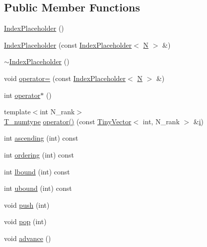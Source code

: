 \subsection*{Public Member Functions}
\begin{DoxyCompactItemize}
\item 
\hyperlink{classIndexPlaceholder_abb86f5feb838be57b819e7605702fbcc}{Index\+Placeholder} ()
\item 
\hyperlink{classIndexPlaceholder_ad400b91c1d9890bc6dda225f463881ae}{Index\+Placeholder} (const \hyperlink{classIndexPlaceholder}{Index\+Placeholder}$<$ \hyperlink{polmisc_8c_a0240ac851181b84ac374872dc5434ee4}{N} $>$ \&)
\item 
\hyperlink{classIndexPlaceholder_a0469c320881ec280c0bc1f306fba70e5}{$\sim$\+Index\+Placeholder} ()
\item 
void \hyperlink{classIndexPlaceholder_ad698d06fd1560d26c3f886a3815e25d7}{operator=} (const \hyperlink{classIndexPlaceholder}{Index\+Placeholder}$<$ \hyperlink{polmisc_8c_a0240ac851181b84ac374872dc5434ee4}{N} $>$ \&)
\item 
int \hyperlink{classIndexPlaceholder_a61492d0ba2621fa0597af0840057364c}{operator$\ast$} ()
\item 
{\footnotesize template$<$int N\+\_\+rank$>$ }\\\hyperlink{classIndexPlaceholder_ad03df79ee5a3bed19e6a8de0dd67cc16}{T\+\_\+numtype} \hyperlink{classIndexPlaceholder_a0e0c9c95eca77ea0c30996f941856ee1}{operator()} (const \hyperlink{classTinyVector}{Tiny\+Vector}$<$ int, N\+\_\+rank $>$ \&\hyperlink{indexexpr_8h_aabd77643995707c185e95c8cb2782c81}{i})
\item 
int \hyperlink{classIndexPlaceholder_ab2a8f50faa136325186a2d2d604268f0}{ascending} (int) const 
\item 
int \hyperlink{classIndexPlaceholder_a98a3e547003f55008d9b1274cf40f3c9}{ordering} (int) const 
\item 
int \hyperlink{classIndexPlaceholder_a798ba3dad14615498ca30a0fb3989d97}{lbound} (int) const 
\item 
int \hyperlink{classIndexPlaceholder_ac7c6d785b577ffd4054c51065b4d0654}{ubound} (int) const 
\item 
void \hyperlink{classIndexPlaceholder_aead71a4be0cbb4b3d16e8c6532cafef1}{push} (int)
\item 
void \hyperlink{classIndexPlaceholder_abfa8e6ccfa867f4702899a5facf9a1dc}{pop} (int)
\item 
void \hyperlink{classIndexPlaceholder_a489f7339a551d77f59ab7f01fcc95a20}{advance} ()

\end{DoxyCompactItemize}

